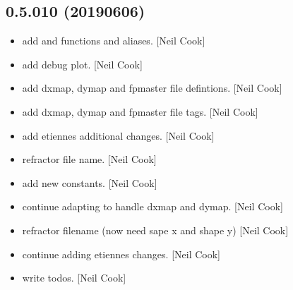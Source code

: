 \documentclass[a4paper,10pt,english]{report}
\begin{document}
\subsection{0.5.010 (2019\sphinxhyphen{}06\sphinxhyphen{}06)}
\label{\detokenize{misc/changelog:id145}}\begin{itemize}
\item {} 
 \sphinxhyphen{} add  and  functions and
aliases. {[}Neil Cook{]}

\item {} 
 \sphinxhyphen{} add  debug plot. {[}Neil
Cook{]}

\item {} 
 \sphinxhyphen{} add dxmap, dymap and fpmaster file defintions. {[}Neil
Cook{]}

\item {} 
 \sphinxhyphen{} add dxmap, dymap and fpmaster file tags. {[}Neil Cook{]}

\item {} 
 \sphinxhyphen{} add etiennes additional changes. {[}Neil Cook{]}

\item {} 
 \sphinxhyphen{} refractor file name. {[}Neil Cook{]}

\item {} 
 \sphinxhyphen{} add new  constants. {[}Neil Cook{]}

\item {} 
 \sphinxhyphen{} continue adapting  to handle
dxmap and dymap. {[}Neil Cook{]}

\item {} 
 \sphinxhyphen{} refractor filename (now need sape x and shape y)
{[}Neil Cook{]}

\item {} 
 \sphinxhyphen{} continue adding etiennes changes. {[}Neil Cook{]}

\item {} 
 \sphinxhyphen{} write todos. {[}Neil Cook{]}

\end{itemize}
\end{document}
